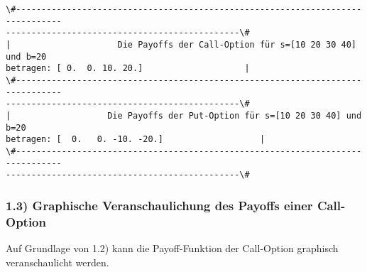 \documentclass[paper=landscape]{scrartcl}
\begin{document}
    \begin{Verbatim}[commandchars=\\\{\}]
\#-------------------------------------------------------------------------------
----------------------------------------------\#
|                     Die Payoffs der Call-Option für s=[10 20 30 40] und b=20
betragen: [ 0.  0. 10. 20.]                    |
\#-------------------------------------------------------------------------------
----------------------------------------------\#
|                   Die Payoffs der Put-Option für s=[10 20 30 40] und b=20
betragen: [  0.   0. -10. -20.]                   |
\#-------------------------------------------------------------------------------
----------------------------------------------\#
    \end{Verbatim}

    \hypertarget{graphische-veranschaulichung-des-payoffs-einer-call-option}{%
\subsubsection{1.3) Graphische Veranschaulichung des Payoffs einer
Call-Option}\label{graphische-veranschaulichung-des-payoffs-einer-call-option}}

Auf Grundlage von 1.2) kann die Payoff-Funktion der Call-Option
graphisch veranschaulicht werden.
\end{document}

